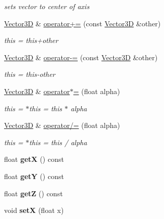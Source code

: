 \begin{DoxyCompactItemize}
\begin{DoxyCompactList}\small\item\em sets vector to center of axis \end{DoxyCompactList}\item 
\hyperlink{class_vector3_d}{\-Vector3\-D} \& \hyperlink{class_vector3_d_a546241ecc51e49e05e7672ffde26bbf8}{operator+=} (const \hyperlink{class_vector3_d}{\-Vector3\-D} \&other)
\begin{DoxyCompactList}\small\item\em this = this+other \end{DoxyCompactList}\item 
\hyperlink{class_vector3_d}{\-Vector3\-D} \& \hyperlink{class_vector3_d_a799f712590c47cc435b929718586555c}{operator-\/=} (const \hyperlink{class_vector3_d}{\-Vector3\-D} \&other)
\begin{DoxyCompactList}\small\item\em this = this-\/other \end{DoxyCompactList}\item 
\hyperlink{class_vector3_d}{\-Vector3\-D} \& \hyperlink{class_vector3_d_a47ff89a047f61471490179dd7ff434e0}{operator$\ast$=} (float alpha)
\begin{DoxyCompactList}\small\item\em this = $\ast$this = this $\ast$ alpha \end{DoxyCompactList}\item 
\hyperlink{class_vector3_d}{\-Vector3\-D} \& \hyperlink{class_vector3_d_ae341e6522441e95684cdd985ebbb02fa}{operator/=} (float alpha)
\begin{DoxyCompactList}\small\item\em this = $\ast$this = this / alpha \end{DoxyCompactList}\item 
\hypertarget{class_vector3_d_ae43bb06d9c0b5829a0f6c6c69dc8b77b}{
float {\bfseries get\-X} () const }
\label{class_vector3_d_ae43bb06d9c0b5829a0f6c6c69dc8b77b}

\item 
\hypertarget{class_vector3_d_a66531e4e56731b53a3443d90a7f17d6c}{
float {\bfseries get\-Y} () const }
\label{class_vector3_d_a66531e4e56731b53a3443d90a7f17d6c}

\item 
\hypertarget{class_vector3_d_a9cba2d4910c7c487920a760614d3f9a8}{
float {\bfseries get\-Z} () const }
\label{class_vector3_d_a9cba2d4910c7c487920a760614d3f9a8}

\item 
\hypertarget{class_vector3_d_ac3904b095a2440b9067effc640cf7e5e}{
void {\bfseries set\-X} (float x)}
\label{class_vector3_d_ac3904b095a2440b9067effc640cf7e5e}


\end{DoxyCompactItemize}
